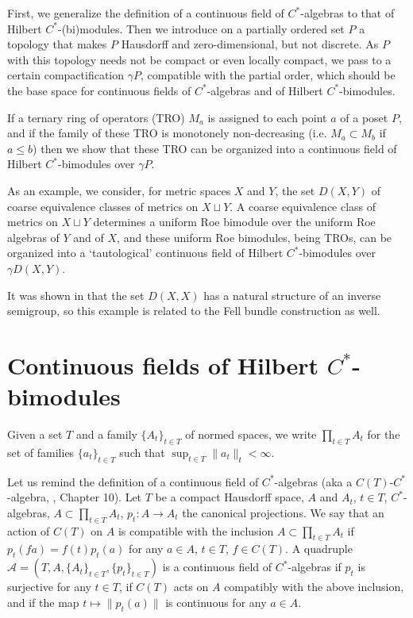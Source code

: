 \documentclass[12pt]{amsart}
\theoremstyle{definition}
\begin{document}
First, we generalize the definition of a continuous field of $C^*$-algebras to that of Hilbert $C^*$-(bi)modules. Then we introduce on a partially ordered set $P$ a topology that makes $P$ Hausdorff and zero-dimensional, but not discrete. 
As $P$ with this topology needs not be compact or even locally compact, we pass to a certain compactification $\gamma P$, compatible with the partial order, which should be the base space for continuous fields of $C^*$-algebras and of Hilbert $C^*$-bimodules.   

If a ternary ring of operators (TRO) $M_a$ is assigned to each point $a$ of a poset $P$, and if the family of these TRO is monotonely non-decreasing (i.e. $M_a\subset M_b$ if $a\leq b$) then we show that these TRO can be organized into a continuous field of Hilbert $C^*$-bimodules over $\gamma P$.   

As an example, we consider, for metric spaces $X$ and $Y$, the set $D(X,Y)$ of coarse equivalence classes of metrics on $X\sqcup Y$. A coarse equivalence class of metrics on $X\sqcup Y$ determines a uniform Roe bimodule \cite{M2} over the uniform Roe algebras of $Y$ and of $X$, and these uniform Roe bimodules, being TROs, can be organized into a `tautological' continuous field of Hilbert $C^*$-bimodules over $\gamma D(X,Y)$. 

It was shown in \cite{M1} that the set $D(X,X)$ has a natural structure of an inverse semigroup, so this example is related to the Fell bundle construction as well.


\section{Continuous fields of Hilbert $C^*$-bimodules}


Given a set $T$ and a family $\{A_t\}_{t\in T}$ of normed spaces, we write $\prod_{t\in T}A_t$ for the set of families $\{a_t\}_{t\in T}$ such that $\sup_{t\in T}\|a_t\|_t<\infty$.

Let us remind the definition of a continuous field of $C^*$-algebras (aka a $C(T)$-$C^*$-algebra, \cite{Dixmier}, Chapter 10).
Let $T$ be a compact Hausdorff space, $A$ and $A_t$, $t\in T$, $C^*$-algebras, $A\subset\prod_{t\in T}A_t$, $p_t:A\to A_t$ the canonical projections. We say that an action of $C(T)$ on $A$ is compatible with the inclusion $A\subset\prod_{t\in T}A_t$ if $p_t(fa)=f(t)p_t(a)$ for any $a\in A$, $t\in T$, $f\in C(T)$. A quadruple $\mathcal A=(T,A,\{A_t\}_{t\in T},\{p_t\}_{t\in T})$ is a continuous field of $C^*$-algebras if $p_t$ is surjective for any $t\in T$, if $C(T)$ acts on $A$ compatibly with the above inclusion, and if the map $t\mapsto\| p_t(a)\|$ is continuous for any $a\in A$.
\end{document}
